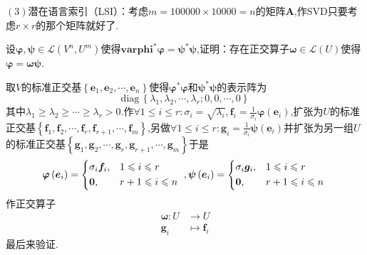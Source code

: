 $(3)$潜在语言索引（LSI）：考虑$m=100000\times 10000=n$的矩阵$\bm{A}$,作SVD只要考虑$r\times r$的那个矩阵就好了.
\begin{brown}
    \begin{example}
        设$\bm{\varphi},\bm{\psi}\in\mathcal{L}\left(V^n,U^m\right)$使得$\bm{varphi}^*\bm{\varphi}=\bm{\psi}^*\bm{\psi}$,证明：存在正交算子$\bm{\omega}\in\mathcal{L}\left(U\right)$使得$\bm{\varphi}=\bm{\omega\psi}$.
    \end{example}
    \begin{Proof}
        取$V$的标准正交基$\left\{
            \bm{e}_1,\bm{e}_2,\cdots,\bm{e}_n
            \right\}$使得$\bm{\varphi}^*\bm{\varphi}$和$\bm{\psi}^*\bm{\psi}$的表示阵为\[
            \mathrm{diag}\,\left\{
                \lambda_1,\lambda_2,\cdots,\lambda_r;0,0,\cdots,0
            \right\}
            \]其中$\lambda_1\geqslant\lambda_2\geqslant\cdots\geqslant\lambda_r>0$.作$\displaystyle\forall1\leqslant i\leqslant r:\sigma_i=\sqrt{\lambda_i},\bm{f}_i=\frac{1}{\sigma_i}\bm{\varphi}\left(\bm{e}_i\right)$,扩张为$U$的标准正交基$\left\{
                \bm{f}_1,\bm{f}_2,\cdots,\bm{f}_r,\bm{f}_{r+1},\cdots,\bm{f}_m
            \right\}$,另做$\displaystyle\forall1\leqslant i\leqslant r:\bm{g}_i=\frac{1}{\sigma_i}\bm{\psi}\left(\bm{e}_i\right)$并扩张为另一组$U$的标准正交基$
            \left\{
                \bm{g}_1,\bm{g}_2,\cdots,\bm{g}_r,\bm{g}_{r+1},\cdots,\bm{g}_m
                \right\}
            $于是\[
            \bm{\varphi}\left(
                \bm{e}_i
            \right)=\begin{cases*}
                \sigma_i\bm{f}_i,&$1\leqslant i\leqslant r$\\
                \bm{0},&$r+1\leqslant i\leqslant n$
            \end{cases*},\bm{\psi}\left(
                \bm{e}_i
            \right)=\begin{cases*}
                \sigma_i\bm{g}_i,&$1\leqslant i\leqslant r$\\
                \bm{0},&$r+1\leqslant i\leqslant n$
            \end{cases*}
            \]作正交算子\begin{align*}
                \bm{\omega}:U&\longrightarrow U\\
                \bm{g}_i&\longmapsto\bm{f}_i
            \end{align*}最后来验证.


\end{Proof}
\end{brown}
